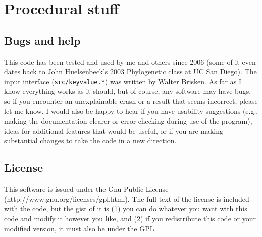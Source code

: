 \documentclass[10pt]{article}
\begin{document}
\section*{Procedural stuff}

\subsection*{Bugs and help}
This code has been tested and used by me and others since 2006 (some of it even dates back to John Huelsenbeck's 2003 Phylogenetic class at UC San Diego).
The input interface (\texttt{src/keyvalue.*}) was written by Walter Brisken.
As far as I know everything works as it should, but of course, any software may have bugs, so if you encounter an unexplainable crash or a result that seems incorrect, please let me know.
I would also be happy to hear if you have usability suggestions (e.g., making the documentation clearer or error-checking during use of the program), ideas for additional features that would be useful, or if you are making substantial changes to take the code in a new direction.

\subsection*{License}
This software is issued under the Gnu Public License (http://www.gnu.org/licenses/gpl.html).  
The full text of the license is included with the code, but the gist of it is (1) you can do whatever you want with this code and modify it however you like, and (2) if you redistribute this code or your modified version, it must also be under the GPL.
\end{document}
